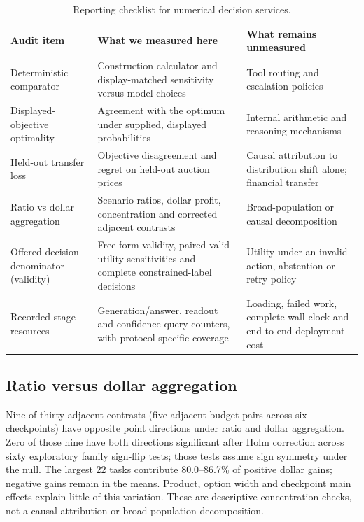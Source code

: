 \documentclass[sigconf,anonymous,nonacm]{acmart}
\begin{document}
\begin{table}[t]
\caption{Reporting checklist for numerical decision services.}\label{tab:reportingchecklist}
\centering\small
\begin{tabularx}{\textwidth}{@{}p{}XX@{}}\toprule
Audit item & What we measured here & What remains unmeasured \\\midrule
Deterministic comparator & Construction calculator and display-matched sensitivity versus model choices & Tool routing and escalation policies \\
Displayed-objective optimality & Agreement with the optimum under supplied, displayed probabilities & Internal arithmetic and reasoning mechanisms \\
Held-out transfer loss & Objective disagreement and regret on held-out auction prices & Causal attribution to distribution shift alone; financial transfer \\
Ratio vs dollar aggregation & Scenario ratios, dollar profit, concentration and corrected adjacent contrasts & Broad-population or causal decomposition \\
Offered-decision denominator (validity) & Free-form validity, paired-valid utility sensitivities and complete constrained-label decisions & Utility under an invalid-action, abstention or retry policy \\
Recorded stage resources & Generation/answer, readout and confidence-query counters, with protocol-specific coverage & Loading, failed work, complete wall clock and end-to-end deployment cost \\
\bottomrule\end{tabularx}
\end{table}

\subsection{Ratio versus dollar aggregation}
Nine of thirty adjacent contrasts (five adjacent budget pairs across six checkpoints) have opposite point directions under ratio and dollar aggregation. Zero of those nine have both directions significant after Holm correction across sixty exploratory family sign-flip tests; those tests assume sign symmetry under the null. The largest 22 tasks contribute 80.0--86.7\% of positive dollar gains; negative gains remain in the means. Product, option width and checkpoint main effects explain little of this variation. These are descriptive concentration checks, not a causal attribution or broad-population decomposition.
\end{document}
